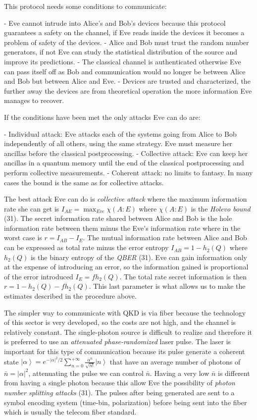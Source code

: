This protocol needs some conditions to communicate:

- Eve cannot intrude into Alice’s and Bob’s devices because this protocol guarantees a safety on the channel, if Eve reads inside the devices it becomes a problem of safety of the devices.
- Alice and Bob must trust the random number generators, if not Eve can study the statistical distribution of the source and improve its predictions.
- The classical channel is authenticated otherwise Eve can pass itself off as Bob and  communication would no longer be between Alice and Bob but between Alice and Eve.
- Devices are trusted and characterized, the further away the devices are from theoretical operation the more information Eve manages to recover.

If the conditions have been met the only attacks Eve can do are:

- Individual attack: Eve attacks each of the systems going from Alice to Bob independently of all others, using the same strategy. Eve must measure her ancillas before the classical postprocessing.
- Collective attack: Eve can keep her ancillas in a quantum memory until the end of the classical postprocessing and perform collective measurements.
- Coherent attack: no limits to fantasy. In many cases the bound is the same as for collective attacks.

The best attack Eve can do is \textit{collective attack} where the maximum information rate she can get is  $I_{AE} = \max_{Eve} \chi(A:E)$ where $\chi(A:E)$ is the \textit{Holevo bound} (31).  The secret information rate shared between Alice and Bob is the hole information rate between them minus the Eve's information rate where in the worst case is $r = I_{AB} - I_{E}$. The mutual information rate between Alice and Bob can be expressed as total rate minus the error entropy $I_{AB} = 1 - h_2(Q)$ where $h_2(Q)$ is the binary entropy of the \textit{QBER} (31). Eve can gain information only at the expense of introducing an error, so the information gained is proportional of the error introduced $I_E = f h_2(Q)$. The total rate secret information is then $r = 1 - h_2(Q) - f h_2(Q)$. This last parameter is what allows us to make the estimates described in the procedure above.


The simpler way to communicate with QKD is via fiber because the technology of this sector is very developed, so the costs are not high, and the channel is relatively constant. The single-photon source is difficult to realize and therefore it is preferred to use an \textit{attenuated phase-randomized} laser pulse. The laser is important for this type of communication because its pulse generate a coherent state $\left|\alpha\right> = e^{- |\alpha|^2 / 2} \sum_{n=0}^{+\infty} \frac{\alpha^n}{\sqrt{n!}} \left|n\right>$ that have an average number of photons of $\bar{n} = |\alpha|^2$, attenuating the pulse we can control $\bar{n}$. Having a very low $\bar{n}$ is different from having a single photon because this allow Eve the possibility of \textit{photon number splitting attacks} (31). The pulses after being generated are sent to a symbol encoding system (time-bin, polarization) before being sent into the fiber which is usually the telecom fiber standard.

